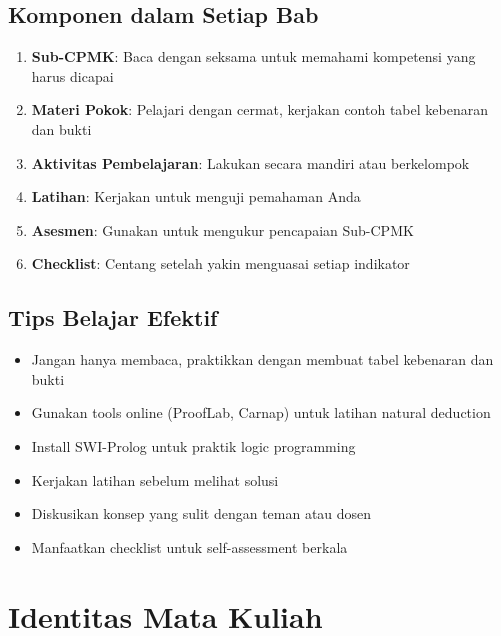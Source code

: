 \section*{Komponen dalam Setiap Bab}

\begin{enumerate}
  \item \textbf{Sub-CPMK}: Baca dengan seksama untuk memahami kompetensi yang harus dicapai
  \item \textbf{Materi Pokok}: Pelajari dengan cermat, kerjakan contoh tabel kebenaran dan bukti
  \item \textbf{Aktivitas Pembelajaran}: Lakukan secara mandiri atau berkelompok
  \item \textbf{Latihan}: Kerjakan untuk menguji pemahaman Anda
  \item \textbf{Asesmen}: Gunakan untuk mengukur pencapaian Sub-CPMK
  \item \textbf{Checklist}: Centang setelah yakin menguasai setiap indikator
\end{enumerate}

\section*{Tips Belajar Efektif}

\begin{itemize}
  \item Jangan hanya membaca, praktikkan dengan membuat tabel kebenaran dan bukti
  \item Gunakan tools online (ProofLab, Carnap) untuk latihan natural deduction
  \item Install SWI-Prolog untuk praktik logic programming
  \item Kerjakan latihan sebelum melihat solusi
  \item Diskusikan konsep yang sulit dengan teman atau dosen
  \item Manfaatkan checklist untuk self-assessment berkala
\end{itemize}

\cleardoublepage

\chapter*{Identitas Mata Kuliah}

